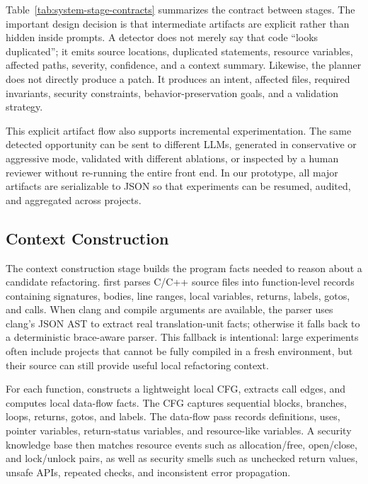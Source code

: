 Table~\ref{tab:system-stage-contracts} summarizes the contract between stages.
The important design decision is that intermediate artifacts are explicit rather
than hidden inside prompts. A detector does not merely say that code ``looks
duplicated''; it emits source locations, duplicated statements, resource
variables, affected paths, severity, confidence, and a context summary. Likewise,
the planner does not directly produce a patch. It produces an intent, affected
files, required invariants, security constraints, behavior-preservation goals,
and a validation strategy.

This explicit artifact flow also supports incremental experimentation. The same
detected opportunity can be sent to different LLMs, generated in conservative
or aggressive mode, validated with different ablations, or inspected by a human
reviewer without re-running the entire front end. In our prototype, all major
artifacts are serializable to JSON so that experiments can be resumed, audited,
and aggregated across projects.

\subsection{Context Construction}
\label{sec:design-context}

The context construction stage builds the program facts needed to reason about a
candidate refactoring. \SysName{} first parses C/C++ source files into
function-level records containing signatures, bodies, line ranges, local
variables, returns, labels, gotos, and calls. When clang and compile arguments
are available, the parser uses clang's JSON AST to extract real translation-unit
facts; otherwise it falls back to a deterministic brace-aware parser. This
fallback is intentional: large experiments often include projects that cannot be
fully compiled in a fresh environment, but their source can still provide useful
local refactoring context.

For each function, \SysName{} constructs a lightweight local CFG,
extracts call edges, and computes local data-flow facts. The CFG
captures sequential blocks, branches, loops, returns, gotos, and labels. The
data-flow pass records definitions, uses, pointer variables, return-status
variables, and resource-like variables. A security knowledge base then matches
resource events such as allocation/free, open/close, and lock/unlock pairs, as
well as security smells such as unchecked return values, unsafe APIs, repeated
checks, and inconsistent error propagation.

